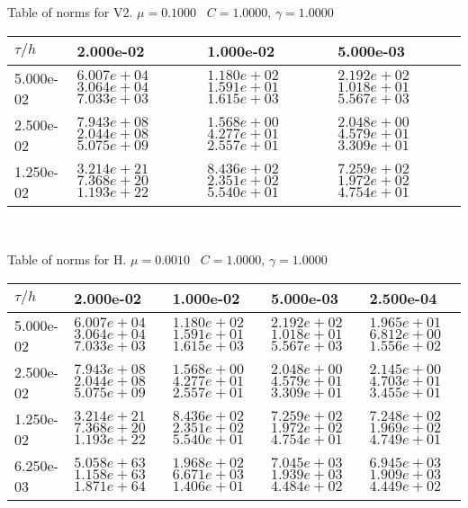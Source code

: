 \newpage
\begin{center}
	Table of norms for V2. $\mu = 0.1000$ \, $C = 1.0000$, $\gamma = 1.0000$
	
	\begin{tabular}{|p{1in}|p{1in}|p{1in}|p{1in}|} \hline
		$\tau / h$ &2.000e-02 &1.000e-02 &5.000e-03 \\ \hline 
		5.000e-02 & $6.007e+04$  $3.064e+04$  $7.033e+03$  & $1.180e+02$  $1.591e+01$  $1.615e+03$  & $2.192e+02$  $1.018e+01$  $5.567e+03$ \\ \hline 
		2.500e-02 & $7.943e+08$  $2.044e+08$  $5.075e+09$  & $1.568e+00$  $4.277e+01$  $2.557e+01$  & $2.048e+00$  $4.579e+01$  $3.309e+01$ \\ \hline 
		1.250e-02 & $3.214e+21$  $7.368e+20$  $1.193e+22$  & $8.436e+02$  $2.351e+02$  $5.540e+01$  & $7.259e+02$  $1.972e+02$  $4.754e+01$ \\ \hline 
		
	\end{tabular}\\[20pt]
\end{center}


\newpage
\begin{center}
	Table of norms for H. $\mu = 0.0010$ \, $C = 1.0000$, $\gamma = 1.0000$
	
	\begin{tabular}{|p{1in}|p{1in}|p{1in}|p{1in}|p{1in}|} \hline
		$\tau / h$ &2.000e-02 &1.000e-02 &5.000e-03 &2.500e-04 \\ \hline 
		5.000e-02 & $6.007e+04$  $3.064e+04$  $7.033e+03$  & $1.180e+02$  $1.591e+01$  $1.615e+03$  & $2.192e+02$  $1.018e+01$  $5.567e+03$  & $1.965e+01$  $6.812e+00$  $1.556e+02$  \\ \hline 
		2.500e-02 & $7.943e+08$  $2.044e+08$  $5.075e+09$  & $1.568e+00$  $4.277e+01$  $2.557e+01$  & $2.048e+00$  $4.579e+01$  $3.309e+01$  & $2.145e+00$  $4.703e+01$  $3.455e+01$  \\ \hline 
		1.250e-02 & $3.214e+21$  $7.368e+20$  $1.193e+22$  & $8.436e+02$  $2.351e+02$  $5.540e+01$  & $7.259e+02$  $1.972e+02$  $4.754e+01$  & $7.248e+02$  $1.969e+02$  $4.749e+01$  \\ \hline 
		6.250e-03 & $5.058e+63$  $1.158e+63$  $1.871e+64$  & $1.968e+02$  $6.671e+03$  $1.406e+01$  & $7.045e+03$  $1.939e+03$  $4.484e+02$  & $6.945e+03$  $1.909e+03$  $4.449e+02$  \\ \hline 
		
	\end{tabular}\\[20pt]
\end{center}


